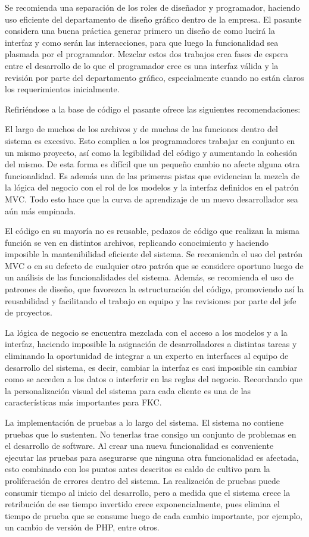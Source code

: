 Se recomienda una separación de los roles de diseñador y programador, haciendo uso eficiente del departamento de diseño gráfico dentro de la empresa. El pasante considera una buena práctica generar primero un diseño de como lucirá la interfaz y como serán las interacciones, para que luego la funcionalidad sea plasmada por el programador. Mezclar estos dos trabajos crea fases de espera entre el desarrollo de lo que el programador cree es una interfaz válida y la revisión por parte del departamento gráfico, especialmente cuando no están claros los requerimientos inicialmente.

Refiriéndose a la base de código el pasante ofrece las siguientes recomendaciones:

El largo de muchos de los archivos y de muchas de las funciones dentro del sistema es excesivo. Esto complica a los programadores trabajar en conjunto en un mismo proyecto, así como la legibilidad del código y aumentando la cohesión del mismo. De esta forma es difícil que un pequeño cambio no afecte alguna otra funcionalidad. Es además una de las primeras pistas que evidencian la mezcla de la lógica del negocio con el rol de los modelos y la interfaz definidos en el patrón MVC. Todo esto hace que la curva de aprendizaje de un nuevo desarrollador sea aún más empinada.

El código en su mayoría no es reusable, pedazos de código que realizan la misma función se ven en distintos archivos, replicando conocimiento y haciendo imposible la mantenibilidad eficiente del sistema. Se recomienda el uso del patrón MVC o en su defecto de cualquier otro patrón que se considere oportuno luego de un análisis de las funcionalidades del sistema. Además, se recomienda el uso de patrones de diseño, que favorezca la estructuración del código, promoviendo así la reusabilidad y facilitando el trabajo en equipo y las revisiones por parte del jefe de proyectos.

La lógica de negocio se encuentra mezclada con el acceso a los modelos y a la interfaz, haciendo imposible la asignación de desarrolladores a distintas tareas y eliminando la oportunidad de integrar a un experto en interfaces al equipo de desarrollo del sistema, es decir, cambiar la interfaz es casi imposible sin cambiar como se acceden a los datos o interferir en las reglas del negocio. Recordando que la personalización visual del sistema para cada cliente es una de las características más importantes para FKC.

La implementación de pruebas a lo largo del sistema. El sistema no contiene pruebas que lo sustenten. No tenerlas trae consigo un conjunto de problemas en el desarrollo de software. Al crear una nueva funcionalidad es conveniente ejecutar las pruebas para asegurarse que ninguna otra funcionalidad es afectada, esto combinado con los puntos antes descritos es caldo de cultivo para la proliferación de errores dentro del sistema. La realización de pruebas puede consumir tiempo al inicio del desarrollo, pero a medida que el sistema crece la retribución de ese tiempo invertido crece exponencialmente, pues elimina el tiempo de prueba que se consume luego de cada cambio importante, por ejemplo, un cambio de versión de PHP, entre otros.

